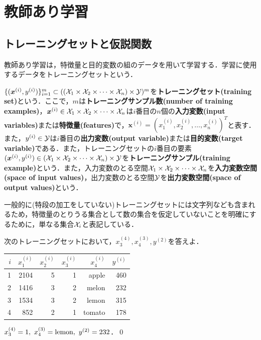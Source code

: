 \chapter{教師あり学習}

\section{トレーニングセットと仮説関数}

教師あり学習は，特徴量と目的変数の組のデータを用いて学習する．学習に使用するデータをトレーニングセットという．

\begin{defi}[トレーニングセット]
$\{(\bm{x}^{(i)},y^{(i)})\}_{i=1}^m \subset (({\cal X}_1 \times {\cal X}_2\times \cdots \times{\cal X}_n) \times {\cal Y})^m$を{\bf トレーニングセット(training set)}という．ここで，$m$は{\bf トレーニングサンプル数(number of training examples)}，${\bm x}^{(i)} \in {\cal X}_1 \times {\cal X}_2\times \cdots \times {\cal X}_n$は$i$番目の$n$個の{\bf 入力変数(input variables)}または{\bf 特徴量(features)}で，${\bm x}^{(i)}=(x_1^{(i)},x_2^{(i)},\ldots,x_n^{(i)})^T$と表す．また，$y^{(i)} \in {\cal Y}$は$i$番目の{\bf 出力変数(output variable)}または{\bf 目的変数(target variable)}である．また，トレーニングセットの$i$番目の要素$({\bm x}^{(i)},y^{(i)})\in ({\cal X}_1 \times {\cal X}_2\times \cdots \times{\cal X}_n) \times {\cal Y}$を{\bf トレーニングサンプル(training example)}という．また，入力変数のとる空間${\cal X}_1 \times {\cal X}_2\times \cdots \times{\cal X}_n$を{\bf 入力変数空間(space of input values)}，出力変数のとる空間${\cal Y}$を{\bf 出力変数空間(space of output values)}という．
\end{defi}

\begin{rem}
一般的に(特段の加工をしていない)トレーニングセットには文字列なども含まれるため，特徴量のとりうる集合として数の集合を仮定していないことを明確にするために，単なる集合${\cal X}_i$と表記している．
\end{rem}

\begin{qu}
次のトレーニングセットにおいて，$x_3^{(4)},x_4^{(3)},y^{(2)}$を答えよ．
\begin{table}[H]
\centering
\begin{tabular}{rrrrrr}
\hline
$i$ &$x_1^{(i)}$ &$x_2^{(i)}$ &$x_3^{(i)}$ &$x_4^{(i)}$ & $y^{(i)}$ \\ \hline
1 & 2104 & 5 & 1 & apple & 460 \\
2 & 1416 & 3 & 2 & melon & 232 \\
3 & 1534 & 3 & 2 & lemon & 315 \\
4 & 852  & 2 & 1 & tomato & 178 \\ \hline
\end{tabular}
\end{table}
\end{qu}
\begin{ans}
$x_3^{(4)}=1,~x_4^{(3)}={\rm lemon},~y^{(2)}=232$．\qed
\end{ans}

